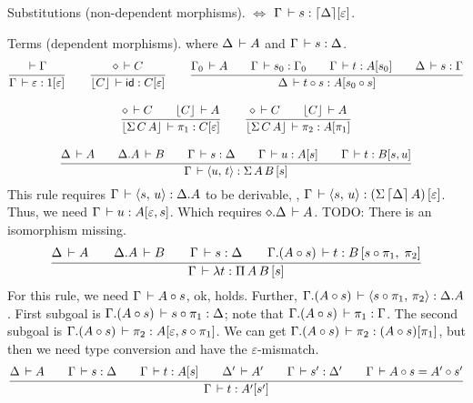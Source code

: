 \documentclass{article}
\newcommand{\pair}[2]{\langle#1,\,#2\rangle}
\newcommand{\eps}{\varepsilon}
\newcommand{\emp}{\eps}
\newcommand{\ty}[1]{\lceil #1 \rceil}
\renewcommand{\cxt}[1]{\lfloor #1 \rfloor}
\newcommand{\SigT}[2]{\Sigma\,#1\,#2}
\renewcommand{\PiT}[2]{\Pi\,#1\,#2}
\renewcommand{\cempty}{\diamond}
\begin{document}
Substitutions (non-dependent morphisms).  $\iff$
$\Gamma \der s : \ty{\Delta} [\emp]$.
%

Terms (dependent morphisms).  where
$\Delta \,\vdash A$ and $\Gamma \,\vdash s : \Delta$.
\begin{gather*}
  \ru{\der \Gamma
    }{\Gamma \der \emp : 1 [\emp]}
\qquad
  \ru{\cempty \der C
    }{\cxt C \der \tid : C [\emp]}
\qquad
  \ru{\Gamma_0 \der A \qquad
      \Gamma \der s_0 : \Gamma_0 \qquad
      \Gamma \der t : A[s_0]   \qquad
      \Delta \der s : \Gamma
    }{\Delta \der t \comp s : A[s_0 \comp s]}
\\[2ex]
  \ru{\cempty \der C \qquad
       \cxt C \der A
    }{\cxt{\SigT C A} \der \pi_1 : C [\emp]}
\qquad
  \ru{\cempty \der C \qquad
       \cxt C \der A
    }{\cxt{\SigT C A} \der \pi_2 : A [\pi_1]}
\\[2ex]
  \ru{\Delta \der A \qquad
      \cext \Delta A \der B \qquad
      \Gamma \der s : \Delta \qquad
      \Gamma \der u : A [s]\qquad
      \Gamma \der t : B [s , u]
    }{\Gamma \der \pair u t : \SigT A B \,[s]}
\end{gather*}
This rule requires $\Gamma \der \pair s u : \cext \Delta A$
to be derivable, \ie,
$\Gamma \der \pair s u : (\SigT {\ty\Delta} A) \, [\emp]$.
Thus, we need $\Gamma \der u  : A [\emp, s]$.
Which requires $\cext \cempty \Delta \der A$.
TODO: There is an isomorphism missing.
\begin{gather*}
  \ru{\Delta \der A \qquad
      \cext \Delta A \der B \qquad
      \Gamma \der s : \Delta \qquad
      \cext \Gamma {(A \comp s)} \der t : B\,[s \comp \pi_1,\; \pi_2]
    }{\Gamma \der \lambda t : \PiT A B \, [s]}
\end{gather*}
For this rule, we need $\Gamma \,\vdash A \circ s$, ok, holds.
Further, $\cext \Gamma {(A \comp s)} \der \pair{s \comp \pi_1}{\pi_2} :
\cext \Delta A$.
First subgoal is
$\Gamma. {(A \circ s)} \,\vdash s \circ \pi_1 : \Delta$;
note that $\Gamma. {(A \circ s)} \,\vdash \pi_1 : \Gamma$.
The second subgoal is
$\cext \Gamma {(A \comp s)} \der \pi_2 : A [\emp, s \comp \pi_1]$.
We can get
$\Gamma. {(A \circ s)} \,\vdash \pi_2 : (A \circ s) [\pi_1]$,
but then we need type conversion and have the $\emp$-mismatch.
\begin{gather*}
  \ru{\Delta \der A \qquad
      \Gamma \der s : \Delta \qquad
      \Gamma \der t : A [s] \qquad
      \Delta' \der A' \qquad
      \Gamma \der s' : \Delta' \qquad
      \Gamma \der A \comp s = A' \comp s'
    }{\Gamma \der t : A' [s']}
\end{gather*}
\end{document}
